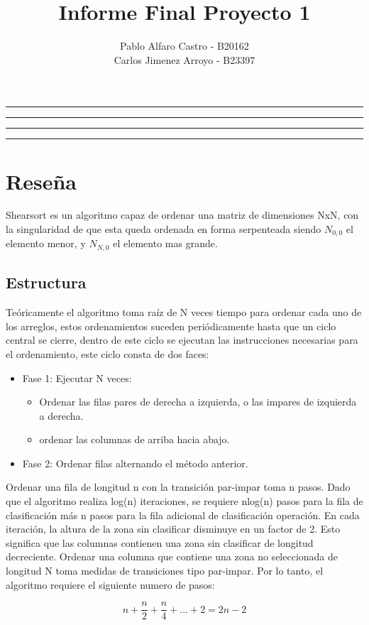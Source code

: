 \documentclass[11pt]{article}
\title{Informe Final Proyecto 1}
\author{Pablo Alfaro Castro - B20162\\Carlos  Jimenez Arroyo - B23397}
\begin{document}
\maketitle
\hrule
\hrule
\tableofcontents
\hspace{5mm}
\hrule
\hrule


\section{Reseña}

 Shearsort es un algoritmo capaz de ordenar una matriz de dimensiones NxN, con la singularidad de que esta queda ordenada en forma serpenteada siendo $N_{0,0}$ el elemento menor, y $N_{N,0}$ el elemento mas grande.
 
\subsection{Estructura}

Teóricamente el algoritmo toma raíz de N veces tiempo para ordenar cada uno de los arreglos, estos ordenamientos suceden periódicamente hasta que un ciclo central se cierre, dentro de este ciclo se ejecutan las instrucciones necesarias para el ordenamiento, este ciclo consta de dos faces:
\begin{itemize}
\item Fase 1: Ejecutar N veces:
\begin{itemize}
\item Ordenar las filas pares de derecha a izquierda, o las impares de izquierda a derecha.
\item ordenar las columnas de arriba hacia abajo.
\end{itemize}
\item Fase 2: Ordenar filas alternando el método anterior.
\end{itemize}


Ordenar una fila de longitud n con la transición par-impar  toma n pasos. Dado que el algoritmo realiza log(n) iteraciones, se requiere nlog(n) pasos para la fila de clasificación más n pasos para la fila adicional de clasificación operación.
En cada iteración, la altura de la zona sin clasificar disminuye en un factor de 2. Esto significa que las columnas contienen una zona sin clasificar de longitud decreciente. Ordenar una columna que contiene una zona no seleccionada de longitud N toma medidas de transiciones tipo par-impar. Por lo tanto, el algoritmo requiere el siguiente numero de pasos:

\begin{equation}
n + \frac{n}{2} + \frac{n}{4} + ... + 2 = 2n - 2
\end{equation}
\end{document}
